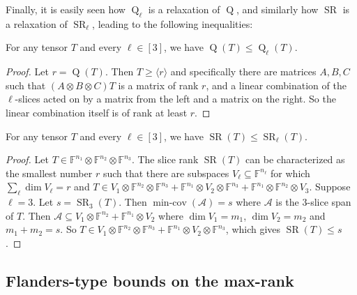 \documentclass{daj}
\DeclareMathOperator{\subrank}{Q}
\DeclareMathOperator{\slicerank}{SR}
\newcommand{\FF}{\mathbb{F}}
\DeclareMathOperator{\mincov}{min-cov}
\begin{document}
Finally, it is easily seen how $\subrank_\ell$ is a relaxation of $\subrank$, and similarly how $\slicerank$ is a relaxation of $\slicerank_\ell$, leading to the following inequalities: %

\begin{lemma}\label{lem:ranks-vs-ranksi}
    For any tensor $T$ and every $\ell\in[3]$, we have $\subrank(T) \leq \subrank_\ell(T)$.
\end{lemma}
\begin{proof}
    Let $r=\subrank(T)$. Then $T\geq\langle r\rangle$ and specifically there are matrices $A,B,C$ such that $(A\otimes B\otimes C)T$ is a matrix of rank $r$, and a linear combination of the $\ell$-slices acted on by a matrix from the left and a matrix on the right. So the linear combination itself is of rank at least $r$.
\end{proof}

\begin{lemma}
    For any tensor $T$ and every $\ell\in[3]$, we have $\slicerank(T) \leq \slicerank_\ell(T)$.
\end{lemma}    
%
%
%
%
%
\begin{proof}
%
%
    Let $T \in \FF^{n_1} \otimes \FF^{n_2} \otimes \FF^{n_3}$.
    The slice rank $\slicerank(T)$ can be characterized \cite{sawin} as the smallest number $r$ such that there are subspaces $V_\ell \subseteq \FF^{n_\ell}$ for which $\sum_\ell \dim V_\ell = r$ and $T \in V_1 \otimes \FF^{n_2} \otimes \FF^{n_3} + \FF^{n_1} \otimes V_2 \otimes \FF^{n_3} + \FF^{n_1} \otimes \FF^{n_2} \otimes V_3$.
    Suppose $\ell = 3$. Let $s = \slicerank_3(T)$. Then $\mincov(\mathcal{A}) = s$ where $\mathcal{A}$ is the $3$-slice span of $T$. Then $\mathcal{A} \subseteq V_1 \otimes \FF^{n_2} + \FF^{n_1} \otimes V_2$ where $\dim V_1 = m_1$, $\dim V_2 = m_2$ and $m_1 + m_2 = s$. So $T \in V_1 \otimes \FF^{n_2} \otimes \FF^{n_3} + \FF^{n_1} \otimes V_2 \otimes \FF^{n_3}$, which gives $\slicerank(T) \leq s$.
\end{proof}
\subsection{Flanders-type bounds on the max-rank}\label{subsec:flanders}
\end{document}
